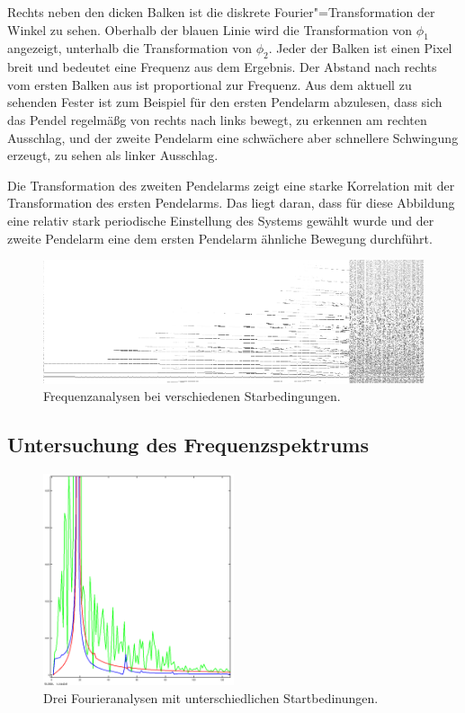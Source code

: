 Rechts neben den dicken Balken ist die diskrete Fourier"=Transformation der Winkel zu sehen.
Oberhalb der blauen Linie wird die Transformation von $\phi_1$ angezeigt, unterhalb die Transformation von $\phi_2$.
Jeder der Balken ist einen Pixel breit und bedeutet eine Frequenz aus dem Ergebnis.
Der Abstand nach rechts vom ersten Balken aus ist proportional zur Frequenz.
Aus dem aktuell zu sehenden Fester ist zum Beispiel für den ersten Pendelarm abzulesen, dass sich das Pendel regelmäßg von rechts nach links bewegt, zu erkennen am rechten Ausschlag, und der zweite Pendelarm eine schwächere aber schnellere Schwingung erzeugt, zu sehen als linker Ausschlag.

Die Transformation des zweiten Pendelarms zeigt eine starke Korrelation mit der Transformation des ersten Pendelarms. Das liegt daran, dass für diese Abbildung eine relativ stark periodische Einstellung des Systems gewählt wurde und der zweite Pendelarm eine dem ersten Pendelarm ähnliche Bewegung durchführt.

\begin{figure}
  \includegraphics[width=\textwidth]{images/fourier_20s_cropped.png}
  \caption{Frequenzanalysen bei verschiedenen Starbedingungen.}
  \label{fig:frequencies}
\end{figure}

\subsection{Untersuchung des Frequenzspektrums}

\begin{figure}
  \includegraphics[width=0.5\textwidth]{images/fourier_100_400_900.png}
  \caption{Drei Fourieranalysen mit unterschiedlichen Startbedinungen.}
  \label{fig:fourieranalysen}
\end{figure}

